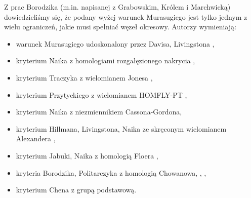 Z prac Borodzika (m.in. \cite{grabowski20} napisanej z Grabowskim, Królem i Marchwicką) dowiedzieliśmy się, że podany wyżej warunek Murasugiego jest tylko jednym z wielu ograniczeń, jakie musi spełniać węzeł okresowy.
Autorzy wymieniają:
\begin{itemize}
    \item warunek Murasugiego udoskonalony przez Davisa, Livingstona \cite{davis1991},
%
%
    \item kryterium Naika z homologiami rozgałęzionego nakrycia \cite{naik1997},
%
%
%
    \item kryterium Traczyka z wielomianem Jonesa \cite{traczyk1991},
%
%
    \item kryterium Przytyckiego z wielomianem HOMFLY-PT \cite{przytyckij1989},
%
%
    \item kryterium Naika z niezmiennikiem Cassona-Gordona,
%
%
    \item kryterium Hillmana, Livingstona, Naika ze skręconym wielomianem Alexandera \cite{hillman2006},
%
%
%
%
    \item kryterium Jabuki, Naika z homologią Floera \cite{jabuka2016},
%
%
%
    \item kryteria Borodzika, Politarczyka z homologią Chowanowa, \cite{politarczyk2017}, \cite{politarczyk2021},
%
%
%
    \item kryterium Chena \cite{chen2018} z grupą podstawową.
%
%
\end{itemize}
%

%


